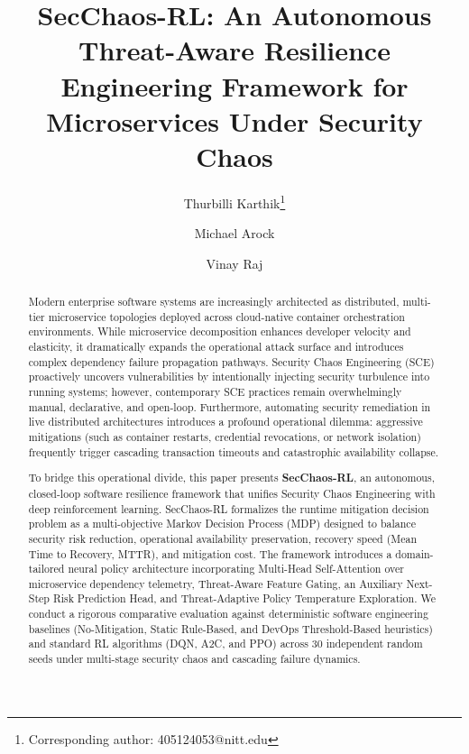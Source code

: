 \documentclass[11pt,a4paper]{article}
\title{\textbf{SecChaos-RL: An Autonomous Threat-Aware Resilience Engineering Framework for Microservices Under Security Chaos}}
\author[1]{Thurbilli Karthik\thanks{Corresponding author: 405124053@nitt.edu}}
\author[1]{Michael Arock}
\author[2]{Vinay Raj}
\affil[1]{Department of Computer Applications, National Institute of Technology, Tiruchirappalli 620015, Tamil Nadu, India}
\affil[2]{Department of Computational \& Data Science, National Institute of Technology, Warangal 506004, Telangana, India}
\date{}
\begin{document}
\maketitle

\begin{abstract}
Modern enterprise software systems are increasingly architected as distributed, multi-tier microservice topologies deployed across cloud-native container orchestration environments. While microservice decomposition enhances developer velocity and elasticity, it dramatically expands the operational attack surface and introduces complex dependency failure propagation pathways. Security Chaos Engineering (SCE) proactively uncovers vulnerabilities by intentionally injecting security turbulence into running systems; however, contemporary SCE practices remain overwhelmingly manual, declarative, and open-loop. Furthermore, automating security remediation in live distributed architectures introduces a profound operational dilemma: aggressive mitigations (such as container restarts, credential revocations, or network isolation) frequently trigger cascading transaction timeouts and catastrophic availability collapse.

To bridge this operational divide, this paper presents \textbf{SecChaos-RL}, an autonomous, closed-loop software resilience framework that unifies Security Chaos Engineering with deep reinforcement learning. SecChaos-RL formalizes the runtime mitigation decision problem as a multi-objective Markov Decision Process (MDP) designed to balance security risk reduction, operational availability preservation, recovery speed (Mean Time to Recovery, MTTR), and mitigation cost. The framework introduces a domain-tailored neural policy architecture incorporating Multi-Head Self-Attention over microservice dependency telemetry, Threat-Aware Feature Gating, an Auxiliary Next-Step Risk Prediction Head, and Threat-Adaptive Policy Temperature Exploration. We conduct a rigorous comparative evaluation against deterministic software engineering baselines (No-Mitigation, Static Rule-Based, and DevOps Threshold-Based heuristics) and standard RL algorithms (DQN, A2C, and PPO) across 30 independent random seeds under multi-stage security chaos and cascading failure dynamics. 


\end{abstract}
\end{document}

